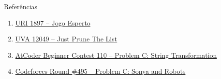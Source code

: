 \begin{frame}[fragile]{Referências}

    \begin{enumerate}
        \item \href{https://www.urionlinejudge.com.br/judge/pt/problems/view/1897}{URI 1897 -- Jogo Esperto}

        \item \href{https://uva.onlinejudge.org/index.php?option=com_onlinejudge&Itemid=8&page=show_problem&category=0&problem=3200&mosmsg=Submission+received+with+ID+23116414}{UVA 12049 -- Just Prune The List}

        \item \href{https://atcoder.jp/contests/abc110/tasks/abc110_c}{AtCoder Beginner Contest 110 -- Problem C: String Transformation}

        \item \href{https://codeforces.com/problemset/problem/1004/C}{Codeforces Round \#495 -- Problem C: Sonya and Robots}

    \end{enumerate}

\end{frame}
